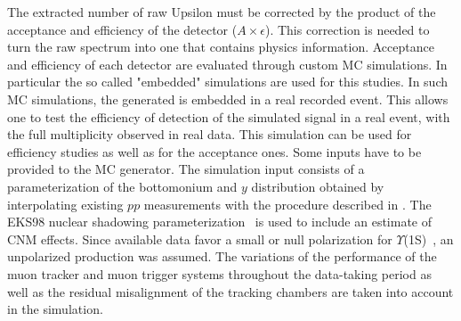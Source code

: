 The extracted number of raw Upsilon must be corrected by the product of the acceptance and efficiency of the detector ($A\times\epsilon$).
This correction is needed to turn the raw spectrum into one that contains physics information.
Acceptance and efficiency of each detector are evaluated through custom MC simulations.
In particular the so called "embedded" simulations are used for this studies.
In such MC simulations, the generated \upsi is embedded in a real recorded event.
This allows one to test the efficiency of detection of the simulated signal in a real event, with the full multiplicity observed in real data.
This simulation can be used for efficiency studies as well as for the acceptance ones.
Some inputs have to be provided to the MC generator.
The simulation input consists of a parameterization of the bottomonium \pt and $y$ distribution obtained by interpolating existing $pp$ measurements \cite{Acosta:2001gv,LHCb:2012aa,Khachatryan:2010zg} with the procedure described in \cite{Bossu:2011qe}.
The EKS98 nuclear shadowing parameterization~\cite{Eskola:1998df} is used to include an estimate of CNM effects.
Since available data favor a small or null polarization for $\Upsilon$(1S)~\cite{Abazov:2008aa,CDF:2011ag,Chatrchyan:2012woa}, an unpolarized production was assumed. 
The variations of the performance of the muon tracker and muon trigger systems throughout the data-taking period as well as the residual misalignment of the tracking chambers are taken into account in the simulation.

